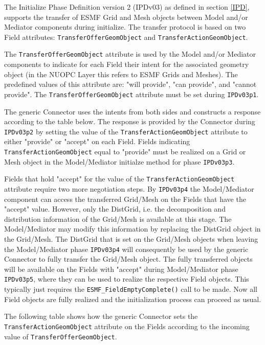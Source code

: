 %

\label{TransferGeom}

The Initialize Phase Definition version 2 (IPDv03) as defined in section \ref{IPD}, supports the transfer of ESMF Grid and Mesh objects between Model and/or Mediator components during initialize. The transfer protocol is based on two Field attributes: {\tt TransferOfferGeomObject} and {\tt TransferActionGeomObject}.

The {\tt TransferOfferGeomObject} attribute is used by the Model and/or Mediator components to indicate for each Field their intent for the associated geometry object (in the NUOPC Layer this refers to ESMF Grids and Meshes). The predefined values of this attribute are: "will provide", "can provide", and "cannot provide". The {\tt TransferOfferGeomObject} attribute must be set during {\tt IPDv03p1}.

The generic Connector uses the intents from both sides and constructs a response according to the table below. The response is provided by the Connector during {\tt IPDv03p2} by setting the value of the {\tt TransferActionGeomObject} attribute to either "provide" or "accept" on each Field. Fields indicating {\tt TransferActionGeomObject} equal to "provide" must be realized on a Grid or Mesh object in the Model/Mediator initialze method for phase {\tt IPDv03p3}.

Fields that hold "accept" for the value of the {\tt TransferActionGeomObject} attribute require two more negotiation steps. By {\tt IPDv03p4} the Model/Mediator component can access the transferred Grid/Mesh on the Fields that have the "accept" value. However, only the DistGrid, i.e. the decomposition and distribution information of the Grid/Mesh is available at this stage. The Model/Mediator may modify this information by replacing the DistGrid object in the Grid/Mesh. The DistGrid that is set on the Grid/Mesh objects when leaving the Model/Mediator phase {\tt IPDv03p4} will consequently be used by the generic Connector to fully transfer the Grid/Mesh object. The fully transferred objects will be available on the Fields with "accept" during Model/Mediator phase {\tt IPDv03p5}, where they can be used to realize the respective Field objects. This typically just requires the {\tt ESMF\_FieldEmptyComplete()} call to be made. Now all Field objects are fully realized and the initialization process can proceed as usual.

The following table shows how the generic Connector sets the {\tt TransferActionGeomObject} attribute on the Fields according to the incoming value of {\tt TransferOfferGeomObject}.

